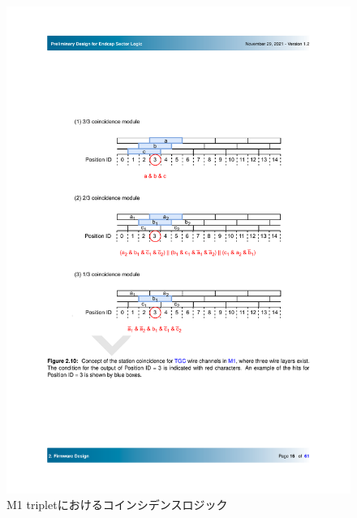 \begin{figure} 
\centering
\includegraphics[width=16cm]{fig/SL/StationCoin_wire.pdf}
\caption[M1 tripletにおけるコインシデンスロジック]{M1 tripletにおけるコインシデンスロジック}
\label{StationCoin_wire}
\end{figure}

